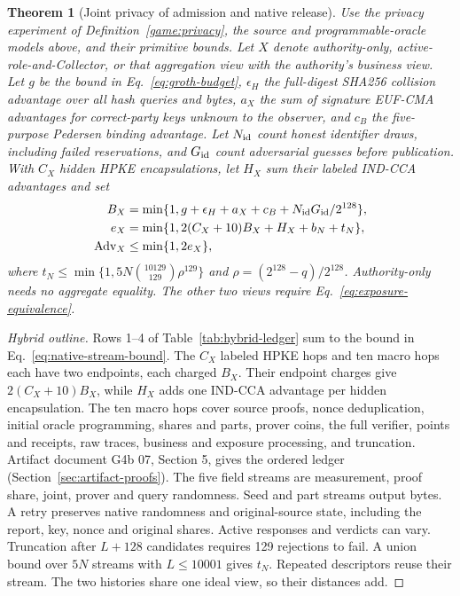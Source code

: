 \documentclass[conference,compsoc]{IEEEtran}
\theoremstyle{definition}
\numberwithin{equation}{section}
\numberwithin{table}{section}
\numberwithin{figure}{section}
\theoremstyle{plain}
\newtheorem{theorem}{Theorem}[section]
\newtheorem{theorem}{Theorem}
\begin{document}
\begin{theorem}[Joint privacy of admission and native release]
\label{thm:native-single-batch-privacy}
Use the privacy experiment of Definition~\ref{game:privacy}, the source and
programmable-oracle models above, and their primitive bounds.
Let \(X\) denote authority-only, active-role-and-Collector, or that
aggregation view with the authority's business view. Let \(g\) be the bound
in Eq.~\eqref{eq:groth-budget}, \(\epsilon_H\) the full-digest SHA256 collision
advantage over all hash queries and bytes, \(a_X\) the sum of signature
EUF-CMA advantages for correct-party keys unknown to the
observer, and \(c_B\) the five-purpose Pedersen binding advantage. Let
\(N_{\rm id}\) count honest identifier draws, including failed reservations,
and \(G_{\rm id}\) count adversarial guesses before publication. With \(C_X\)
hidden HPKE encapsulations, let \(H_X\) sum their labeled IND-CCA advantages and set
\begin{align}
 B_X&=\min\{1,g+\epsilon_H+a_X+c_B+N_{\rm id}G_{\rm id}/2^{128}\},
 \label{eq:route-bound}\\
 e_X&=\min\{1,2(C_X+10)B_X+H_X+b_N+t_N\},\\
 \operatorname{Adv}_X&\le\min\{1,2e_X\},
 \label{eq:native-joint-bound}
\end{align}
where \(t_N\le\min\{1,5N\binom{10129}{129}\rho^{129}\}\) and
\(\rho=(2^{128}-q)/2^{128}\). Authority-only needs no aggregate equality.
The other two views require Eq.~\eqref{eq:exposure-equivalence}.
\end{theorem}
\begin{proof}[Hybrid outline]
Rows 1--4 of Table~\ref{tab:hybrid-ledger} sum to the bound in
Eq.~\eqref{eq:native-stream-bound}. The \(C_X\) labeled HPKE hops and ten
macro hops each have two endpoints, each charged \(B_X\). Their endpoint
charges give \(2(C_X+10)B_X\), while \(H_X\) adds one IND-CCA advantage per
hidden encapsulation. The ten macro hops cover source proofs, nonce
deduplication, initial oracle programming, shares and parts, prover coins,
the full verifier, points and receipts, raw traces, business and exposure
processing, and truncation. Artifact document G4b 07, Section 5, gives
the ordered ledger (Section~\ref{sec:artifact-proofs}).
The five field streams are measurement, proof share, joint,
prover and query randomness. Seed and part streams output bytes. A retry
preserves native randomness and original-source state, including the report,
key, nonce and original shares. Active responses and verdicts can vary.
Truncation after
\(L+128\) candidates requires 129 rejections to fail. A union bound over
\(5N\) streams with \(L\le10001\) gives \(t_N\). Repeated descriptors
reuse their stream. The two histories share one ideal view, so their distances
add.
\end{proof}
\end{document}

